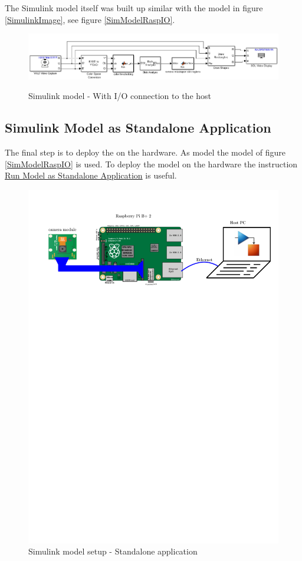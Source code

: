 \documentclass[Bachelorarbeit.tex]{subfiles}
\begin{document}
The Simulink model itself was built up similar with the model in figure \ref{SimulinkImage}, see figure \ref{SimModelRaspIO}.
\begin{figure}[!h]
\centering
\includegraphics[width=14cm]{./img/simulink/Simulink_RaspberryPi.PNG} 
\label{SimModelRaspIO}
\caption{Simulink model - With I/O connection to the host}
\label{SimModelWithIO}
\end{figure}

\subsection{Simulink Model as Standalone Application}
The final step is to deploy the on the hardware. As model the model of figure \ref{SimModelRaspIO} is used. To deploy the model on the hardware the instruction \href{https://de.mathworks.com/help/supportpkg/rtlsdrradio/ug/run-model-as-standalone-application.html}{Run Model as Standalone Application} is useful.

\begin{figure}[!h]
\centering
\includegraphics[page=2,width=14cm]{./img/raspberryPi/setups.pdf} 
\caption{Simulink model setup - Standalone application}
\label{SimModelWithIO}
\end{figure}
\end{document}

